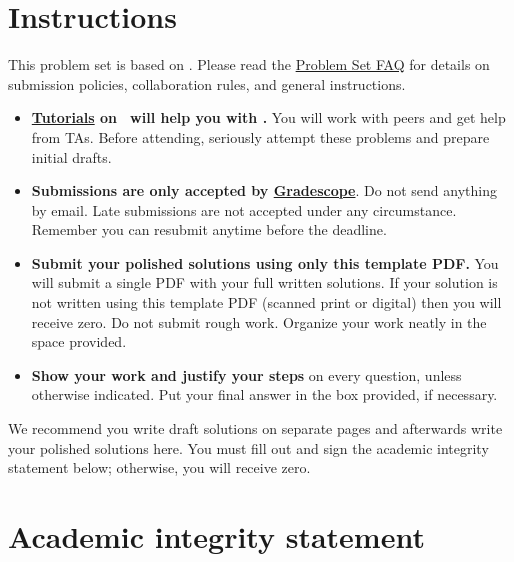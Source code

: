\declarecommand{\makeinstructions}
{ 
\section*{Instructions}
This problem set is based on \docinfo. Please read the \href{\urlFAQ}{Problem Set FAQ} for details on submission policies, collaboration  rules, and general instructions.  
\begin{itemize}
	\item \textbf{\href{\urlLMS/pages/tutorials}{Tutorials} on \tutorialdate\, will help you with \docname.} You will work with peers and get help from TAs. Before attending, seriously attempt these problems and prepare initial drafts.
	\item \textbf{Submissions are only accepted by \href{\urlGrading}{Gradescope}}. Do not send anything by email.  Late submissions are not accepted under any circumstance. Remember you can resubmit anytime before the deadline. 
	\item \textbf{Submit your polished solutions using only this template PDF.} You will submit a single PDF with your full written solutions. If your solution is not written using this template PDF (scanned print or digital) then you will receive zero. Do not submit rough work. Organize your work neatly in the space provided.  
	\item \textbf{Show your work and justify your steps} on every question, unless otherwise indicated. Put your final answer in the box provided, if necessary. 
\end{itemize}
We recommend you write draft solutions on separate pages and afterwards write your polished solutions here. You must fill out and sign the academic integrity statement below; otherwise, you will receive zero. 

\section*{Academic integrity statement}
}
